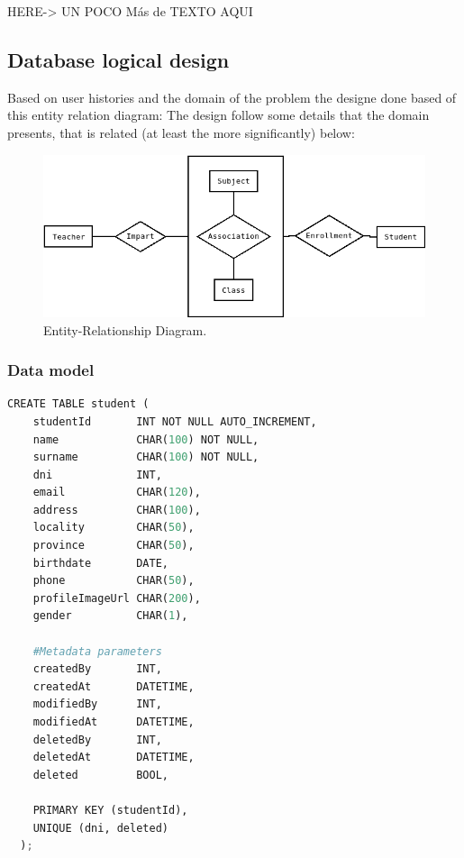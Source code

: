 HERE-> UN POCO Más de TEXTO AQUI



\subsection{Database logical design}

Based on user histories and the domain of the problem the designe
done based of this entity relation diagram:
\intro
The design follow some details that the domain presents, that is related
(at least the more significantly) below:

\begin{figure}[H]
  \includegraphics[scale=0.4]{img/diagrams/dbms-ER.png}
  \centering
  \caption{Entity-Relationship Diagram.}
\end{figure}


\subsubsection{Data model}
\begin{lstlisting}[language=python,frame=none]
  CREATE TABLE student (
    studentId       INT NOT NULL AUTO_INCREMENT,
    name            CHAR(100) NOT NULL,
    surname         CHAR(100) NOT NULL,
    dni             INT,
    email           CHAR(120),
    address         CHAR(100),
    locality        CHAR(50),
    province        CHAR(50),
    birthdate       DATE,
    phone           CHAR(50),
    profileImageUrl CHAR(200),
    gender          CHAR(1),

    #Metadata parameters
    createdBy       INT,
    createdAt       DATETIME,
    modifiedBy      INT,
    modifiedAt      DATETIME,
    deletedBy       INT,
    deletedAt       DATETIME,
    deleted         BOOL,

    PRIMARY KEY (studentId),
    UNIQUE (dni, deleted)
  );
\end{lstlisting}

